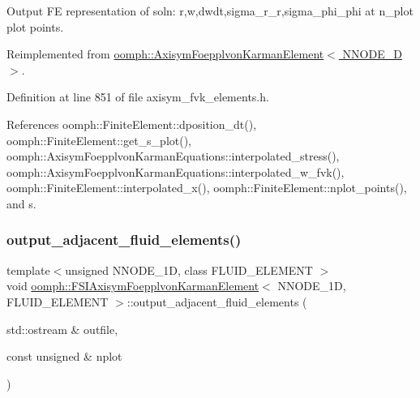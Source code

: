 Output FE representation of soln\+: r,w,dwdt,sigma\+\_\+r\+\_\+r,sigma\+\_\+phi\+\_\+phi at n\+\_\+plot plot points. 



Reimplemented from \hyperlink{classoomph_1_1AxisymFoepplvonKarmanElement_a435aab946dfcaa0b23e7df59e9bc3933}{oomph\+::\+Axisym\+Foepplvon\+Karman\+Element$<$ N\+N\+O\+D\+E\+\_\+D $>$}.



Definition at line 851 of file axisym\+\_\+fvk\+\_\+elements.\+h.



References oomph\+::\+Finite\+Element\+::dposition\+\_\+dt(), oomph\+::\+Finite\+Element\+::get\+\_\+s\+\_\+plot(), oomph\+::\+Axisym\+Foepplvon\+Karman\+Equations\+::interpolated\+\_\+stress(), oomph\+::\+Axisym\+Foepplvon\+Karman\+Equations\+::interpolated\+\_\+w\+\_\+fvk(), oomph\+::\+Finite\+Element\+::interpolated\+\_\+x(), oomph\+::\+Finite\+Element\+::nplot\+\_\+points(), and s.

\mbox{\label{classoomph_1_1FSIAxisymFoepplvonKarmanElement_a61bf4a77d5d6b44c037c2fa9d9e9453d}} 
\subsubsection{\texorpdfstring{output\+\_\+adjacent\+\_\+fluid\+\_\+elements()}{output\_adjacent\_fluid\_elements()}}
{\footnotesize\ttfamily template$<$unsigned N\+N\+O\+D\+E\+\_\+1D, class F\+L\+U\+I\+D\+\_\+\+E\+L\+E\+M\+E\+NT $>$ \\
void \hyperlink{classoomph_1_1FSIAxisymFoepplvonKarmanElement}{oomph\+::\+F\+S\+I\+Axisym\+Foepplvon\+Karman\+Element}$<$ N\+N\+O\+D\+E\+\_\+1D, F\+L\+U\+I\+D\+\_\+\+E\+L\+E\+M\+E\+NT $>$\+::output\+\_\+adjacent\+\_\+fluid\+\_\+elements (\begin{DoxyParamCaption}\item[{std\+::ostream \&}]{outfile,  }\item[{const unsigned \&}]{nplot }\end{DoxyParamCaption})\hspace{0.3cm}{\ttfamily [inline]}}



